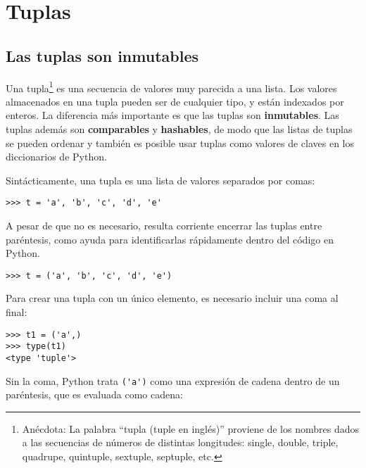 
\chapter{Tuplas}
\label{tuplechap}

\section{Las tuplas son inmutables}


Una tupla\footnote{Anécdota: La palabra ``tupla (tuple en inglés)'' proviene de los nombres
dados a las secuencias de números de distintas longitudes: single,
double, triple, quadrupe, quintuple, sextuple, septuple, etc.}
es una secuencia de valores muy parecida a una lista.
Los valores almacenados en una tupla pueden ser de cualquier tipo, y
están indexados por enteros.
La diferencia más importante es que las tuplas son {\bf inmutables}.
Las tuplas además son {\bf comparables} y {\bf hashables}, de modo que
las listas de tuplas se pueden ordenar y también es posible usar tuplas
como valores de claves en los diccionarios de Python.


Sintácticamente, una tupla es una lista de valores separados por comas:

\beforeverb
\begin{verbatim}
>>> t = 'a', 'b', 'c', 'd', 'e'
\end{verbatim}
\afterverb
%
A pesar de que no es necesario, resulta corriente encerrar las tuplas entre
paréntesis, como ayuda para identificarlas rápidamente dentro del
código en Python.


\beforeverb
\begin{verbatim}
>>> t = ('a', 'b', 'c', 'd', 'e')
\end{verbatim}
\afterverb
%
Para crear una tupla con un único elemento, es necesario incluir una coma
al final:


\beforeverb
\begin{verbatim}
>>> t1 = ('a',)
>>> type(t1)
<type 'tuple'>
\end{verbatim}
\afterverb
%
Sin la coma, Python trata \verb"('a')" como una expresión
de cadena dentro de un paréntesis, que es evaluada como cadena:

